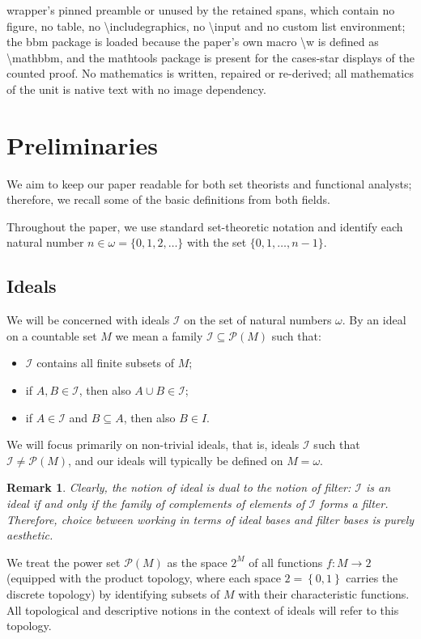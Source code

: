 \documentclass[10pt,a4paper]{amsart}
\newcommand{\I}{\mathcal{I}}
\newtheorem{remark}[theorem]{Remark}
\begin{document}
wrapper's pinned preamble or unused by the retained spans, which contain no figure, no table, no \textbackslash{}includegraphics, no \textbackslash{}input and no custom list environment; the bbm package is loaded because the paper's own macro \textbackslash{}w is defined as \textbackslash{}mathbbm, and the mathtools package is present for the cases-star displays of the counted proof. No mathematics is written, repaired or re-derived; all mathematics of the unit is native text with no image dependency.
\section{Preliminaries}
We aim to keep our paper readable for both set theorists and functional analysts; therefore, we recall some of the basic definitions from both fields.

Throughout the paper, we use standard set-theoretic notation and identify each natural number $n\in\omega=\{0,1,2,\ldots\}$ with the set $\{0,1,\ldots,n-1\}$.

\subsection{Ideals}
We will be concerned with ideals $\I$ on the set of natural numbers $\omega$. By an ideal on a countable set $M$ we mean a family $\I \subseteq \mathcal{P}(M)$ such that:
\begin{itemize}
    \item $\I$ contains all finite subsets of $M$;
    \item if $A,B \in \I$, then also $A\cup B \in \I$;
    \item if $A \in \I$ and $B \subseteq A$, then also $B \in I$.
\end{itemize}
We will focus primarily on non-trivial ideals, that is, ideals $\I$ such that $\I \neq \mathcal{P}(M)$, and our ideals will typically be defined on $M=\omega$. 

\begin{remark}
Clearly, the notion of ideal is dual to the notion of filter: $\I$ is an ideal if and only if the family of complements of elements of $\I$ forms a filter. Therefore, choice between working in terms of ideal bases and filter bases is purely aesthetic.
\end{remark}    

We treat the power set $\mathcal{P}(M)$ as the space $2^M$ of all functions $f:M\rightarrow 2$ (equipped with the product topology, where each space $2=\left\{0,1\right\}$ carries the discrete topology) by identifying subsets of $M$ with their characteristic functions. All topological and descriptive notions in the context of ideals will refer to this topology. 
\end{document}
